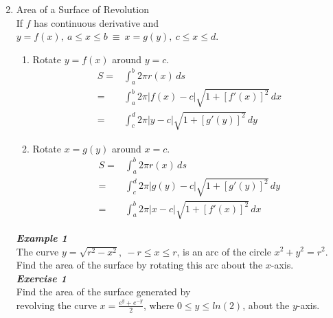 \documentclass[12px]{article}
\begin{document}
\begin{enumerate}
\begin{multicols}{2}
    \end{multicols}
\newpage
\item Area of a Surface of Revolution\\
If $f$ has continuous derivative and $y=f(x),\ a\leq x\leq b\  \equiv\ x=g(y),\ c\leq x\leq d$.
\begin{enumerate}[(1)]
    \item Rotate $y=f(x)$ around $y=c$.\\
    \begin{align}
        \nonumber S=&\int_a^b2\pi r(x)\,ds\\ \nonumber
        =&\int_a^b2\pi |f(x)-c|\sqrt{1+[f'(x)]^2}\,dx\\ \nonumber 
        =&\int_c^d2\pi |y-c|\sqrt{1+[g'(y)]^2}\,dy
    \end{align}
    \item Rotate $x=g(y)$ around $x=c$.\\
    \begin{align}
        \nonumber S=&\int_a^b2\pi r(x)\,ds\\ \nonumber
        =&\int_c^d2\pi |g(y)-c|\sqrt{1+[g'(y)]^2}\,dy\\ \nonumber 
        =&\int_a^b2\pi |x-c|\sqrt{1+[f'(x)]^2}\,dx
    \end{align}
\end{enumerate}
\begin{multicols}{2}
    \textit{\textbf{Example 1}}\\
    The curve $y=\sqrt{r^2-x^2},\ -r\leq x\leq r$,
    is an arc of the circle $x^2+y^2=r^2$.
    Find the area of the surface by rotating this arc about the $x$-axis.\\
    \textit{\textbf{Exercise 1}}\\
    Find the area of the surface generated by\\
    revolving the curve $x=\frac{e^y+e^{-y}}{2}$,
    where $0\leq y\leq ln(2)$, about the $y$-axis.
\end{multicols}
\end{enumerate}
\end{document}
